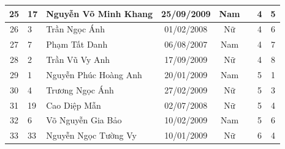 \begin{longtable}{|c|l|p{5cm}|c|c|c|c|c|}
\hline
25 & 17 & Nguyễn Võ Minh Khang & 25/09/2009 & Nam &  & 4 & 5 \\
\hline
26 & 3 & Trần Ngọc Ánh & 01/02/2008 & Nữ &  & 4 & 6 \\
\hline
27 & 7 & Phạm Tất Danh & 06/08/2007 & Nam &  & 4 & 7 \\
\hline
28 & 2 & Trần Vũ Vy Anh & 17/09/2009 & Nữ &  & 4 & 8 \\
\hline
29 & 1 & Nguyễn Phúc Hoàng Anh & 20/01/2009 & Nam &  & 5 & 1 \\
\hline
30 & 4 & Trương Ngọc Ánh & 27/02/2009 & Nữ &  & 5 & 3 \\
\hline
31 & 19 & Cao Diệp Mẫn & 02/07/2008 & Nữ &  & 5 & 4 \\
\hline
32 & 6 & Võ Nguyễn Gia Bảo & 10/02/2009 & Nam &  & 5 & 6 \\
\hline
33 & 33 & Nguyễn Ngọc Tường Vy & 10/01/2009 & Nữ &  & 6 & 4 \\
\hline
\end{longtable}

